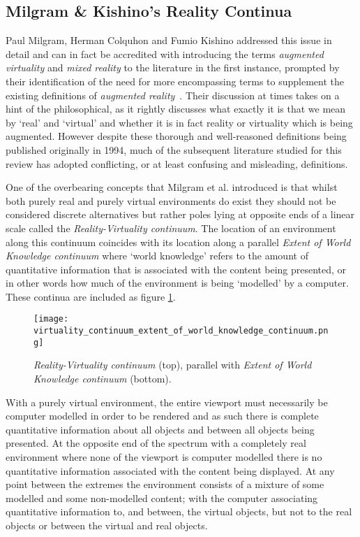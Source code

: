 
\subsection{Milgram \& Kishino's Reality Continua}
Paul Milgram, Herman Colquhon and Fumio Kishino addressed this issue in detail and can in fact be accredited with introducing the terms \textit{augmented virtuality} and \textit{mixed reality} to the literature in the first instance, prompted by their identification of the need for more encompassing terms to supplement the existing definitions of \textit{augmented reality}~\cite{Milgram1994, Milgram1999}. Their discussion at times takes on a hint of the philosophical, as it rightly discusses what exactly it is that we mean by `real' and `virtual' and whether it is in fact reality or virtuality which is being augmented. However despite these thorough and well-reasoned definitions being published originally in 1994, much of the subsequent literature studied for this review has adopted conflicting, or at least confusing and misleading, definitions.

One of the overbearing concepts that Milgram et al. introduced is that whilst both purely real and purely virtual environments do exist they should not be considered discrete alternatives but rather poles lying at opposite ends of a linear scale called the \textit{Reality-Virtuality continuum}. The location of an environment along this continuum coincides with its location along a parallel \textit{Extent of World Knowledge continuum} where `world knowledge' refers to the amount of quantitative information that is associated with the content being presented, or in other words how much of the environment is being `modelled' by a computer. These continua are included as figure \ref{reality_virtuality_extent_of_world_knowledge_continuum}.

\begin{figure}[h]
\centering
\texttt{[image: virtuality\_continuum\_extent\_of\_world\_knowledge\_continuum.png]}
\caption{\textit{Reality-Virtuality continuum} (top), parallel with \textit{Extent of World Knowledge continuum} (bottom).}
\label{reality_virtuality_extent_of_world_knowledge_continuum}
\end{figure}

With a purely virtual environment, the entire viewport must necessarily be computer modelled in order to be rendered and as such there is complete quantitative information about all objects and between all objects being presented. At the opposite end of the spectrum with a completely real environment where none of the viewport is computer modelled there is no quantitative information associated with the content being displayed. At any point between the extremes the environment consists of a mixture of some modelled and some non-modelled content; with the computer associating quantitative information to, and between, the virtual objects, but not to the real objects or between the virtual and real objects.

